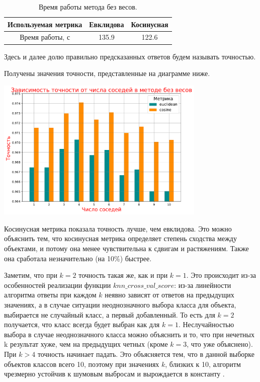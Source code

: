 \documentclass{article}
\begin{document}
\begin{table}[h]
\centering
\begin{tabular}{|c|c|c|}\hline
Используемая метрика & Евклидова & Косинусная \\\hline
Время работы, с & 135.9 & 122.6 \\\hline
\end{tabular}
\caption{\label{tab:widgets2} Время работы метода без весов.}
\end{table}

Здесь и далее долю правильно предсказанных ответов будем называть точностью. 

Получены значения точности, представленные на диаграмме ниже. 
\begin{center}
\includegraphics[width=10cm]{TASK1 PRAC FIGURE 1.pdf}
\end{center}

Косинусная метрика показала точность лучше, чем евклидова. Это можно объяснить тем, что косинусная метрика определяет степень сходства между объектами, и потому она менее чувствительна к сдвигам и растяжениям. Также она сработала незначительно (на 10\%) быстрее. 

Заметим, что при $k=2$ точность такая же, как и при $k=1$. Это происходит из-за особенностей реализации функции $ knn\_cross\_val\_score $: из-за линейности алгоритма ответы при каждом $k$ неявно зависят от ответов на предыдущих значениях, а в случае ситуации неоднозначного выбора класса для объекта, выбирается не случайный класс, а первый добавленный. То есть для $k=2$ получается, что класс всегда будет выбран как для $k=1$. Неслучайностью выбора в случае неоднозначного класса можно объяснить и то, что при нечетных k результат хуже, чем на предыдущих четных (кроме $k=3$, что уже объяснено). При $k>4$ точность начинает падать. Это объясняется тем, что в данной выборке объектов классов всего 10, поэтому при значениях $k$, близких к 10, алгоритм чрезмерно устойчив к шумовым выбросам и вырождается в константу \cite{ss00}.
\end{document}

